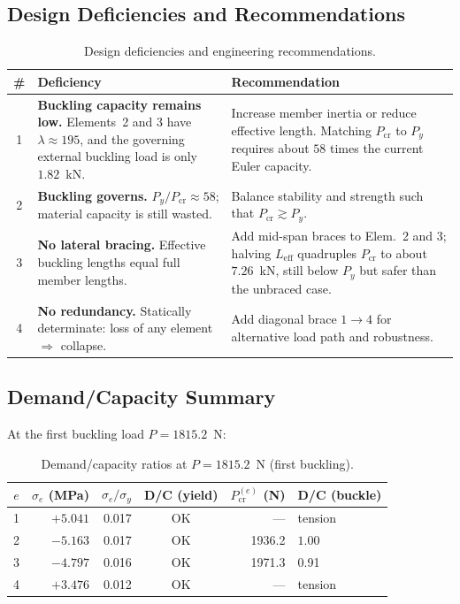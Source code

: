 \documentclass[11pt, a4paper]{article}
\begin{document}
\subsection{Design Deficiencies and Recommendations}

\begin{table}[H]
\centering
\small
\renewcommand{\arraystretch}{1.3}
\begin{tabular}{@{}cp{5.5cm}p{5.5cm}@{}}
\toprule
\# & Deficiency & Recommendation \\
\midrule
1 & \textbf{Buckling capacity remains low.}  Elements~2 and 3 have $\lambda\approx195$, and the governing external buckling load is only $1.82$~kN.
  & Increase member inertia or reduce effective length.  Matching $P_{\text{cr}}$ to $P_y$ requires about $58$ times the current Euler capacity. \\
\midrule
2 & \textbf{Buckling governs.} $P_y/P_{\text{cr}}\approx58$; material capacity is still wasted.
  & Balance stability and strength such that $P_{\text{cr}} \gtrsim P_y$. \\
\midrule
3 & \textbf{No lateral bracing.}  Effective buckling lengths equal full member lengths.
  & Add mid-span braces to Elem.~2 and 3; halving $L_{\text{eff}}$ quadruples $P_{\text{cr}}$ to about $7.26$~kN, still below $P_y$ but safer than the unbraced case. \\
\midrule
4 & \textbf{No redundancy.}  Statically determinate: loss of any element $\Rightarrow$ collapse.
  & Add diagonal brace $1{\to}4$ for alternative load path and robustness. \\
\bottomrule
\end{tabular}
\caption{Design deficiencies and engineering recommendations.}
\label{tab:recommendations}
\end{table}

\subsection{Demand/Capacity Summary}

At the first buckling load $P = 1815.2$~N:

\begin{table}[H]
\centering
\small
\renewcommand{\arraystretch}{1.2}
\begin{tabular}{@{}crrcrl@{}}
\toprule
$e$ & $\sigma_e$ (MPa) & $\sigma_e / \sigma_y$ & D/C (yield) & $P_{\text{cr}}^{(e)}$ (N) & D/C (buckle) \\
\midrule
1 & $+5.041$ & 0.017 & OK & --- & tension \\
2 & $-5.163$ & 0.017 & OK & 1936.2 & $\mathbf{1.00}$ \\
3 & $-4.797$ & 0.016 & OK & 1971.3 & 0.91 \\
4 & $+3.476$ & 0.012 & OK & --- & tension \\
\bottomrule
\end{tabular}
\caption{Demand/capacity ratios at $P=1815.2$~N (first buckling).}
\label{tab:dc_ratios}
\end{table}
\end{document}
